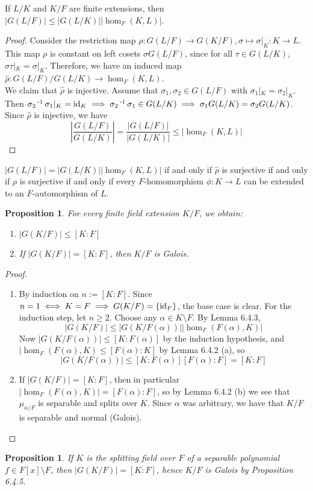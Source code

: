 \documentclass[11pt]{book}
\newcounter{counter}
\newtheorem{proposition}[counter]{Proposition}   \newtheorem{problem}[counter]{Problem}   \newtheorem*{proposition*}{Proposition}   \newtheorem*{lemma*}{Lemma}
\theoremstyle{definition}   \newtheorem{defn}[counter]{Definition} %
\newcommand{\bs}{\setminus}   \newcommand{\A}{\mathcal{A}}   \newcommand{\sy}{\textnormal{Syl}}   \newcommand{\size}[1]{\left| #1 \right|}
\DeclareMathOperator{\ra}{\rightarrow}   \DeclareMathOperator{\Poly}{\mathbf{P}}   \DeclareMathOperator{\spn}{\textnormal{span}}   \DeclareMathOperator{\aut}{\textnormal{Aut}}
\newcommand{\vs}{\vspace{8pt}}
\numberwithin{counter}{chapter}
\begin{document}
\vs

\begin{lemma}
If $L/K$ and $K/F$ are finite extensions, then $|G(L/F)| \leq |G(L/K)| |\hom_F(K,L)|$. 
\end{lemma}

\begin{proof}
Consider the restriction map $\rho : G(L/F) \ra G(K/F), \sigma \mapsto \sigma|_K : K \ra L$. This map $\rho$ is constant on left cosets $\sigma G(L/F)$, since for all $\tau \in G(L/K)$, $\sigma \tau |_K = \sigma|_K$. Therefore, we have an induced map $\hat{\rho} : G(L/F)/G(L/K) \ra \hom_F(K,L)$. \\

We claim that $\hat{\rho}$ is injective. Assume that $\sigma_1,\sigma_2 \in G(L/F)$ with $\sigma_1|_K = \sigma_2|_K$. Then $\sigma_2\operatorname{^{-1}} \sigma_1 |_K = \textnormal{id}_K \implies \sigma_2\operatorname{^{-1}} \sigma_1 \in G(L/K) \implies \sigma_1 G(L/K) = \sigma_2 G(L/K)$. Since $\hat{\rho}$ is injective, we have
	\[\left| \frac{G(L/F)}{G(L/K)} \right| = \frac{|G(L/F)|}{|G(L/K)|} \leq |\hom_F(K,L)| \]
\end{proof}

\vs

\begin{corollary}
$|G(L/F)| = |G(L/K)| |\hom_F(K,L)|$ if and only if $\hat{\rho}$ is surjective if and only if $\rho$ is surjective if and only if every $F$-homomorphism $\phi : K \ra L$ can be extended to an $F$-automorphism of $L$. 
\end{corollary}

\vs

\begin{proposition}
For every finite field extension $K/F$, we obtain:
\begin{enumerate}
\item[(a)] $|G(K/F)| \leq [K : F]$
\item[(b)] If $|G(K/F)| = [K : F]$, then $K/F$ is Galois. 
\end{enumerate}
\end{proposition}

\begin{proof}\ 
\begin{enumerate}
\item[(a)] By induction on $n := [K : F]$. Since $n = 1 \iff K = F \implies G(K/F) = \{\textnormal{id}_F\}$, the base case is clear. For the induction step, let $n \geq 2$. Choose any $\alpha \in K \bs F$. By Lemma 6.4.3,
	\[|G(K/F)| \leq |G(K/F(\alpha))| |\hom_F(F(\alpha),K)| \]
Now $|G(K/F(\alpha))| \leq [K : F(\alpha)]$ by the induction hypothesis, and $|\hom_F(F(\alpha),K) \leq [F(\alpha) : K]$ by Lemma 6.4.2 (a), so
	\[|G(K/F(\alpha))| \leq [K : F(\alpha)] [F(\alpha) : F] = [K : F] \]

\item[(b)] If $|G(K/F)| = [K : F]$, then in particular $|\hom_F(F(\alpha),K)| = [F(\alpha) : F]$, so by Lemma 6.4.2 (b) we see that $\mu_{\alpha/F}$ is separable and splits over $K$. Since $\alpha$ was arbitrary, we have that $K/F$ is separable and normal (Galois). 
\end{enumerate}
\end{proof}

\vs

\begin{proposition}
If $K$ is the splitting field over $F$ of a separable polynomial $f \in F[x] \bs F$, then $|G(K/F)| = [K : F]$, hence $K/F$ is Galois by Proposition 6.4.5. 
\end{proposition}
\end{document}
